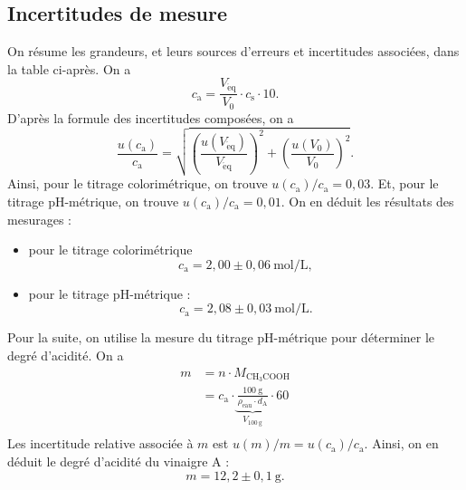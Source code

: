 \documentclass[a4paper,twocolumn,10pt,margin=0.5in]{extreport}
\begin{document}
	\subsection{Incertitudes de mesure}

	On résume les grandeurs, et leurs sources d'erreurs et incertitudes associées, dans la table ci-après.
	On a \[
		c_\mathrm{a} = \frac{V_\mathrm{\acute{e}q}}{V_0} \cdot c_\mathrm{s} \cdot 10
	.\] 
	D'après la formule des incertitudes composées, on a
	\[
		\frac{u(c_\mathrm{a})}{c_\mathrm{a}} = \sqrt{\left( \frac{u(V_\mathrm{\acute{e}q})}{V_\mathrm{\acute{e}q}} \right)^{\!\!2} + \left( \frac{u(V_0)}{V_0} \right)^{\!\!2}}
	.\]
	Ainsi, pour le titrage colorimétrique, on trouve $u(c_\mathrm{a}) / c_\mathrm{a} = 0{,}03$.
	Et, pour le titrage $\mathrm{pH}$-métrique, on trouve $u(c_\mathrm{a}) / c_\mathrm{a} = 0{,}01$.
	On en déduit les résultats des mesurages :
	\begin{itemize}
		\item pour le titrage colorimétrique \[
				c_\mathrm{a} = 2{,}00 \pm 0{,}06 \: \mathrm{mol}/\mathrm{L}
			,\]
		\item pour le titrage $\mathrm{pH}$-métrique : \[
				c_\mathrm{a}  = 2{,}08 \pm 0{,}03\:\mathrm{mol}/\mathrm{L}
			.\]
	\end{itemize}
	Pour la suite, on utilise la mesure du titrage $\mathrm{pH}$-métrique pour déterminer le degré d'acidité.
	On a
	\begin{align*}
		m &= n \cdot M_\mathrm{CH_3 COOH} \\
		&= c_\mathrm{a} \cdot \underbrace{\frac{100\:\mathrm{g}}{\rho_\mathrm{eau} \cdot d_\mathrm{A}}}_{V_\mathrm{100\:g}} \cdot 60  \\
	\end{align*}
	Les incertitude relative associée à $m$ est $u(m) / m = u(c_\mathrm{a}) / c_\mathrm{a}$. Ainsi, on en déduit le degré d'acidité du vinaigre A : \[
		m = 12{,}2 \pm 0{,}1\: \mathrm{g}
	.\]
\end{document}
